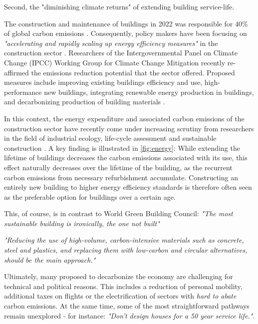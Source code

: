 \documentclass{article}
\begin{document}
\clearpage
\begin{multicols}{2}

Second, the "diminishing climate returns" of extending building service-life.

The construction and maintenance of buildings in 2022 was responsible for 40\% of global carbon emissions \cite{camarasa_energy_2023}. Consequently, policy makers have been focusing on \textit{"accelerating and rapidly scaling up energy efficiency measures"} in the construction sector \cite{noauthor_2022_2022}. Researchers of the Intergovernmental Panel on Climate Change (IPCC) Working Group for Climate Change Mitigation recently re-affirmed the emissions reduction potential that the sector offered. Proposed measures include improving existing buildings efficiency and use, high-performance new buildings, integrating renewable energy production in buildings, and decarbonizing production of building materials \cite{shukla_mitigation_2022}.

In this context, the energy expenditure and associated carbon emissions of the construction sector have recently come under increasing scrutiny from researchers in the field of industrial ecology, life-cycle assessment and sustainable construction \cite{chau_review_2015}\cite{ortiz_sustainability_2009}. A key finding is illustrated in \cref{fig:energy}: While extending the lifetime of buildings decreases the carbon emissions associated with its use, this effect naturally decreases over the lifetime of the building, as the recurrent carbon emissions from necessary refurbishment accumulate. Constructing an entirely new building to higher energy efficiency standards is therefore often seen as the preferable option for buildings over a certain age.

This, of course, is in contrast to World Green Building Council: \textit{"The most sustainable building is ironically, the one not built"}

\textit{"Reducing the use of high-volume, carbon-intensive materials such as concrete, steel and plastics, and replacing them with low-carbon and circular alternatives, should be the main approach."} \cite[Sec. 7.4]{noauthor_2022_2022}

Ultimately, many proposed to decarbonize the economy are challenging for technical and political reasons. This includes a reduction of personal mobility, additional taxes on flights or the electrification of sectors with \textit{hard to abate} carbon emissions. At the same time, some of the most straightforward pathways remain unexplored - for instance: \textit{"Don't design houses for a 50 year service life."}.

\end{multicols}
\end{document}
